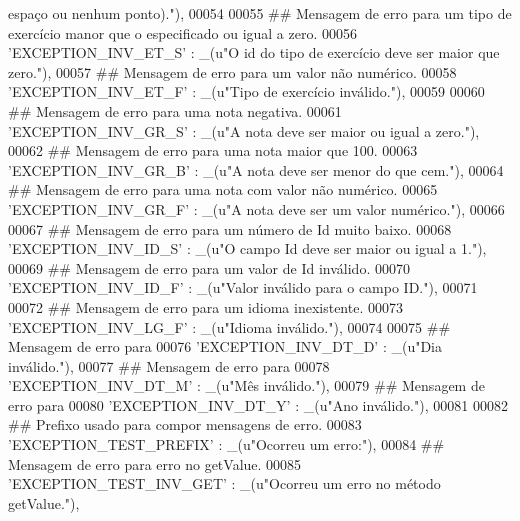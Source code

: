 \begin{DoxyCode}
{       espaço ou nenhum ponto)."}),
00054 
00055     \textcolor{comment}{## Mensagem de erro para um tipo de exercício manor que o especificado ou igual a zero.}
00056     \textcolor{stringliteral}{'EXCEPTION\_INV\_ET\_S'} : \_(\textcolor{stringliteral}{u"O id do tipo de exercício deve ser maior que zero."}),
00057     \textcolor{comment}{## Mensagem de erro para um valor não numérico.}
00058     \textcolor{stringliteral}{'EXCEPTION\_INV\_ET\_F'} : \_(\textcolor{stringliteral}{u"Tipo de exercício inválido."}),
00059 
00060     \textcolor{comment}{## Mensagem de erro para uma nota negativa.}
00061     \textcolor{stringliteral}{'EXCEPTION\_INV\_GR\_S'} : \_(\textcolor{stringliteral}{u"A nota deve ser maior ou igual a zero."}),
00062     \textcolor{comment}{## Mensagem de erro para uma nota maior que 100.}
00063     \textcolor{stringliteral}{'EXCEPTION\_INV\_GR\_B'} : \_(\textcolor{stringliteral}{u"A nota deve ser menor do que cem."}),
00064     \textcolor{comment}{## Mensagem de erro para uma nota com valor não numérico.}
00065     \textcolor{stringliteral}{'EXCEPTION\_INV\_GR\_F'} : \_(\textcolor{stringliteral}{u"A nota deve ser um valor numérico."}),
00066 
00067     \textcolor{comment}{## Mensagem de erro para um número de Id muito baixo.}
00068     \textcolor{stringliteral}{'EXCEPTION\_INV\_ID\_S'} : \_(\textcolor{stringliteral}{u"O campo Id deve ser maior ou igual a 1."}),
00069     \textcolor{comment}{## Mensagem de erro para um valor de Id inválido.}
00070     \textcolor{stringliteral}{'EXCEPTION\_INV\_ID\_F'} : \_(\textcolor{stringliteral}{u"Valor inválido para o campo ID."}),
00071 
00072     \textcolor{comment}{## Mensagem de erro para um idioma inexistente.}
00073     \textcolor{stringliteral}{'EXCEPTION\_INV\_LG\_F'} : \_(\textcolor{stringliteral}{u"Idioma inválido."}),
00074 
00075     \textcolor{comment}{## Mensagem de erro para}
00076     \textcolor{stringliteral}{'EXCEPTION\_INV\_DT\_D'} : \_(\textcolor{stringliteral}{u"Dia inválido."}),
00077     \textcolor{comment}{## Mensagem de erro para}
00078     \textcolor{stringliteral}{'EXCEPTION\_INV\_DT\_M'} : \_(\textcolor{stringliteral}{u"Mês inválido."}),
00079     \textcolor{comment}{## Mensagem de erro para}
00080     \textcolor{stringliteral}{'EXCEPTION\_INV\_DT\_Y'} : \_(\textcolor{stringliteral}{u"Ano inválido."}),
00081 
00082     \textcolor{comment}{## Prefixo usado para compor mensagens de erro.}
00083     \textcolor{stringliteral}{'EXCEPTION\_TEST\_PREFIX'} : \_(\textcolor{stringliteral}{u"Ocorreu um erro:"}),
00084     \textcolor{comment}{## Mensagem de erro para erro no getValue.}
00085     \textcolor{stringliteral}{'EXCEPTION\_TEST\_INV\_GET'} : \_(\textcolor{stringliteral}{u"Ocorreu um erro no método getValue."}),

\end{DoxyCode}
